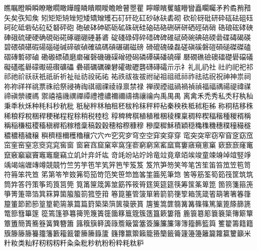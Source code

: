 瞧󠄀瞩󠄀瞪󠄀瞬󠄀瞬󠄁瞭󠄀瞮󠄀瞯󠄀瞰󠄀瞱󠄀瞳󠄀瞵󠄀瞶󠄀瞷󠄀瞹󠄀瞻󠄀瞼󠄀瞽󠄀瞾󠄀瞿󠄀
矃󠄀矇󠄀矉󠄀矍󠄀矑󠄀矒󠄀矕󠄀矗󠄀矙󠄀矚󠄀矛󠄀矜󠄀矞󠄀矟󠄀矠󠄀矢󠄀矣󠄀矤󠄀知󠄀矦󠄀
矧󠄀矩󠄀矩󠄁矪󠄀矬󠄀短󠄀矮󠄀矯󠄀矰󠄀矱󠄀石󠄀矴󠄀矸󠄀矻󠄀矼󠄀砂󠄀砅󠄀砆󠄀砉󠄀砌󠄀
砍󠄀砎󠄀砑󠄀砒󠄀研󠄀砕󠄀砙󠄀砝󠄀砠󠄀砡󠄀砢󠄀砣󠄀砥󠄀砦󠄀砧󠄀砬󠄀砭󠄀砮󠄀砰󠄀砲󠄀
砲󠄁破󠄀砵󠄀砷󠄀砺󠄀砺󠄁砿󠄀硃󠄀硄󠄀硅󠄀硇󠄀硈󠄀硌󠄀硎󠄀硏󠄀硑󠄀硒󠄀硜󠄀硝󠄀硝󠄁
硞󠄀硠󠄀硡󠄀硣󠄀硤󠄀硨󠄀硪󠄀硫󠄀硬󠄀硬󠄁确󠄀硯󠄀硲󠄀硴󠄀硺󠄀硼󠄀硼󠄁硾󠄀碁󠄀碆󠄀
碇󠄀碊󠄀碌󠄀碍󠄀碎󠄀碏󠄀碑󠄀碑󠄁碓󠄀碔󠄀碕󠄀碗󠄀碘󠄀碚󠄀碝󠄀碞󠄀碟󠄀碡󠄀碣󠄀碤󠄀
碧󠄀碨󠄀碩󠄀碪󠄀碬󠄀碭󠄀碯󠄀碰󠄀碱󠄀碲󠄀碳󠄀碵󠄀確󠄀碻󠄀碼󠄀碽󠄀碾󠄀碿󠄀磁󠄀磅󠄀
磆󠄀磇󠄀磈󠄀磉󠄀磊󠄀磋󠄀磌󠄀磎󠄀磐󠄀磑󠄀磒󠄀磓󠄀磔󠄀磔󠄁磕󠄀磖󠄀磚󠄀磛󠄀磟󠄀磠󠄀
磡󠄀磤󠄀磦󠄀磧󠄀磨󠄀磨󠄁磪󠄀磬󠄀磯󠄀磯󠄁磲󠄀磳󠄀磴󠄀磶󠄀磷󠄀磹󠄀磺󠄀磻󠄀磽󠄀磾󠄀
磿󠄀礀󠄀礁󠄀礆󠄀礇󠄀礌󠄀礎󠄀礐󠄀礑󠄀礒󠄀礙󠄀礚󠄀礛󠄀礜󠄀礞󠄀礟󠄀礠󠄀礥󠄀礦󠄀礧󠄀
礨󠄀礩󠄀礪󠄀礪󠄁礫󠄀礬󠄀礭󠄀礮󠄀礰󠄀礱󠄀礴󠄀礴󠄁礵󠄀示󠄀示󠄁礻󠄀礼󠄀礼󠄁礽󠄀社󠄀
社󠄁礿󠄀祀󠄀祀󠄁祁󠄀祁󠄁祂󠄀祄󠄀祅󠄀祆󠄀祇󠄀祇󠄁祈󠄀祈󠄁祉󠄀祉󠄁祊󠄀祋󠄀祏󠄀祐󠄀
祐󠄁祑󠄀祓󠄀祓󠄁祓󠄂祔󠄀祕󠄀祖󠄀祖󠄁祗󠄀祘󠄀祚󠄀祛󠄀祜󠄀祝󠄀祝󠄁神󠄀神󠄁祟󠄀祠󠄀
祢󠄀祢󠄁祥󠄀祥󠄁祧󠄀票󠄀祩󠄀祫󠄀祭󠄀祲󠄀祷󠄀祹󠄀祺󠄀祻󠄀祼󠄀祾󠄀祿󠄀禀󠄀禁󠄀禄󠄀
禅󠄀禊󠄀禋󠄀禌󠄀禍󠄀禍󠄁禎󠄀禎󠄁福󠄀福󠄁禑󠄀禓󠄀禔󠄀禕󠄀禖󠄀禘󠄀禛󠄀禜󠄀禝󠄀禡󠄀
禦󠄀禧󠄀禧󠄁禨󠄀禩󠄀禪󠄀禫󠄀禮󠄀禮󠄁禯󠄀禰󠄀禰󠄁禱󠄀禱󠄁禳󠄀禴󠄀禸󠄀禹󠄀禺󠄀禺󠄁
离󠄀禽󠄀禾󠄀禿󠄀秀󠄀私󠄀秂󠄀秄󠄀秇󠄀秈󠄀秉󠄀秊󠄀秋󠄀秌󠄀种󠄀秏󠄀科󠄀秒󠄀秔󠄀秕󠄀
秖󠄀秘󠄀秚󠄀秝󠄀秞󠄀租󠄀秠󠄀秡󠄀秢󠄀秣󠄀秤󠄀秤󠄁秥󠄀秦󠄀秧󠄀秩󠄀秪󠄀秫󠄀秬󠄀秭󠄀
称󠄀秱󠄀秸󠄀移󠄀秼󠄀稀󠄀稂󠄀稃󠄀稅󠄀稇󠄀稈󠄀稉󠄀稊󠄀程󠄀程󠄁稌󠄀稍󠄀税󠄀稑󠄀稔󠄀
稕󠄀稗󠄀稗󠄁稘󠄀稙󠄀稙󠄁稚󠄀稛󠄀稜󠄀稞󠄀稟󠄀稠󠄀稡󠄀稧󠄀稫󠄀稭󠄀種󠄀稯󠄀稰󠄀稱󠄀
稱󠄁稲󠄀稴󠄀稵󠄀稷󠄀稸󠄀稹󠄀稺󠄀稻󠄀稼󠄀稽󠄀稾󠄀稿󠄀穀󠄀穀󠄁穂󠄀穃󠄀穄󠄀穅󠄀穆󠄀
穇󠄀穈󠄀穉󠄀穌󠄀積󠄀穎󠄀穏󠄀穐󠄀穕󠄀穖󠄀穗󠄀穙󠄀穜󠄀穝󠄀穟󠄀穠󠄀穠󠄁穡󠄀穢󠄀穣󠄀
穥󠄀穧󠄀穩󠄀穪󠄀穫󠄀穭󠄀穰󠄀穴󠄀穴󠄁穴󠄂穵󠄀究󠄀穸󠄀穹󠄀空󠄀空󠄁穽󠄀穾󠄀穿󠄀穿󠄁
窀󠄀突󠄀突󠄁窂󠄀窃󠄀窄󠄀窅󠄀窆󠄀窈󠄀窊󠄀窋󠄀窐󠄀窑󠄀窒󠄀窓󠄀窔󠄀窕󠄀窕󠄁窖󠄀窗󠄀
窗󠄁窘󠄀窞󠄀窟󠄀窠󠄀窣󠄀窩󠄀窪󠄀窬󠄀窮󠄀窮󠄁窯󠄀窰󠄀窳󠄀窵󠄀窶󠄀窹󠄀窺󠄀窻󠄀窼󠄀
窽󠄀窾󠄀窾󠄁窿󠄀竃󠄀竄󠄀竅󠄀竆󠄀竆󠄁竇󠄀竈󠄀竈󠄁竉󠄀竊󠄀立󠄀竌󠄀竍󠄀竎󠄀竏󠄀竑󠄀
竒󠄀竓󠄀竕󠄀站󠄀竚󠄀竛󠄀竜󠄀竝󠄀竟󠄀章󠄀竡󠄀竢󠄀竣󠄀童󠄀竦󠄀竧󠄀竨󠄀竩󠄀竪󠄀竫󠄀
竬󠄀竭󠄀端󠄀竰󠄀竱󠄀竴󠄀競󠄀竸󠄀竹󠄀竺󠄀竻󠄀竽󠄀竾󠄀竿󠄀笂󠄀笄󠄀笆󠄀笇󠄀笈󠄀笈󠄁
笈󠄂笊󠄀笋󠄀笏󠄀笑󠄀笒󠄀笔󠄀笘󠄀笙󠄀笛󠄀笞󠄀笟󠄀笠󠄀笣󠄀笥󠄀符󠄀笧󠄀笨󠄀笩󠄀笪󠄀
笫󠄀第󠄀笭󠄀笮󠄀笯󠄀笰󠄀笱󠄀笳󠄀笴󠄀笵󠄀笶󠄀笹󠄀笻󠄀笽󠄀笿󠄀筀󠄀筁󠄀筅󠄀筆󠄀筇󠄀
筈󠄀等󠄀筋󠄀筌󠄀筍󠄀筎󠄀筏󠄀筐󠄀筑󠄀筑󠄁筒󠄀筓󠄀答󠄀筕󠄀策󠄀筝󠄀筠󠄀筤󠄀筥󠄀筦󠄀
筧󠄀筩󠄀筪󠄀筬󠄀筭󠄀筮󠄀筯󠄀筰󠄀筱󠄀筲󠄀筳󠄀筴󠄀筵󠄀筵󠄁筷󠄀筹󠄀筺󠄀筿󠄀箄󠄀箆󠄀
箇󠄀箉󠄀箋󠄀箍󠄀箎󠄀箏󠄀箐󠄀箑󠄀箒󠄀箔󠄀箕󠄀箖󠄀算󠄀箘󠄀箙󠄀箙󠄁箚󠄀箛󠄀箜󠄀箝󠄀
箞󠄀箟󠄀箠󠄀管󠄀箥󠄀箪󠄀箬󠄀箭󠄀箭󠄁箯󠄀箰󠄀箱󠄀箲󠄀箴󠄀箵󠄀箶󠄀箸󠄀箸󠄁箺󠄀箻󠄀
箼󠄀箽󠄀節󠄀節󠄁節󠄂篁󠄀篂󠄀範󠄀篅󠄀篆󠄀篇󠄀篇󠄁篈󠄀築󠄀築󠄁篊󠄀篋󠄀篌󠄀篏󠄀篔󠄀
篖󠄀篗󠄀篙󠄀篚󠄀篛󠄀篝󠄀篝󠄁篠󠄀篠󠄁篤󠄀篥󠄀篦󠄀篨󠄀篩󠄀篪󠄀篭󠄀篰󠄀篲󠄀篳󠄀篴󠄀
篵󠄀篶󠄀篷󠄀篸󠄀篹󠄀篺󠄀篼󠄀篾󠄀簀󠄀簁󠄀簂󠄀簃󠄀簄󠄀簆󠄀簇󠄀簉󠄀簋󠄀簌󠄀簍󠄀簎󠄀
簏󠄀簑󠄀簒󠄀簓󠄀簔󠄀簔󠄁簗󠄀簙󠄀簛󠄀簞󠄀簟󠄀簠󠄀簡󠄀簣󠄀簥󠄀簦󠄀簧󠄀簨󠄀簪󠄀簫󠄀
簬󠄀簯󠄀簱󠄀簳󠄀簴󠄀簶󠄀簷󠄀簸󠄀簹󠄀簺󠄀簽󠄀簾󠄀簾󠄁簾󠄂簿󠄀簿󠄁籀󠄀籂󠄀籃󠄀籅󠄀
籆󠄀籊󠄀籌󠄀籍󠄀籍󠄁籏󠄀籐󠄀籐󠄁籐󠄂籑󠄀籒󠄀籓󠄀籔󠄀籕󠄀籖󠄀籗󠄀籘󠄀籘󠄁籙󠄀籚󠄀
籛󠄀籜󠄀籝󠄀籞󠄀籟󠄀籠󠄀籡󠄀籣󠄀籤󠄀籥󠄀籧󠄀籩󠄀籩󠄁籬󠄀籭󠄀籮󠄀籯󠄀籰󠄀籲󠄀米󠄀
籵󠄀籹󠄀类󠄀籼󠄀籽󠄀籾󠄀籾󠄁籾󠄂粁󠄀粂󠄀粂󠄁粃󠄀粆󠄀粇󠄀粉󠄀粉󠄁粋󠄀粍󠄀粏󠄀粐󠄀
